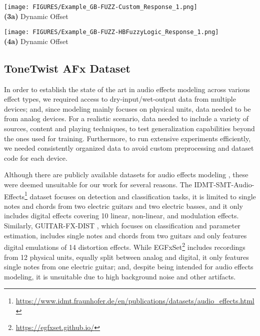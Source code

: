 \begin{figure*}[t]
    \begin{minipage}[b]{.50\textwidth}
        \centering
        \texttt{[image: FIGURES/Example\_GB-FUZZ-Custom\_Response\_1.png]}
        \\\textbf{(3a)} Dynamic Offset
        \label{fig:ex_offblock_response_1}
    \end{minipage}
    \begin{minipage}[b]{.50\textwidth}
        \centering
        \texttt{[image: FIGURES/Example\_GB-FUZZ-HBFuzzyLogic\_Response\_1.png]}
        \\\textbf{(4a)} Dynamic Offset
        \label{fig:ex_offblock_response_2}
    \end{minipage}
    \caption{Examples of response for gray-box models of (1) Flamma Compressor, (2) UA 6176 - 1176LN Limiter, (3) Custom Dynamic Fuzz, (4) Harley Benton Fuzzy Logic.}
    \label{fig:gb-comp-dist_example-response}
\end{figure*}

\subsection{ToneTwist AFx Dataset}
\label{sec:tonetwist}

In order to establish the state of the art in audio effects modeling across various effect types, we required access to dry-input/wet-output data from multiple devices; and, since modeling mainly focuses on physical units, data needed to be from analog devices.
For a realistic scenario, data needed to include a variety of sources, content and playing techniques, to test generalization capabilities beyond the ones used for training.
Furthermore, to run extensive experiments efficiently, we needed consistently organized data to avoid custom preprocessing and dataset code for each device.

Although there are publicly available datasets for audio effects modeling \citep{stein2010automatic, comunita2021guitar, pedroza2022egfxset}, these were deemed unsuitable for our work for several reasons.
The IDMT-SMT-Audio-Effects\footnote{\url{https://www.idmt.fraunhofer.de/en/publications/datasets/audio\_effects.html}} \citep{stein2010automatic} dataset focuses on detection and classification tasks, it is limited to single notes and chords from two electric guitars and two electric basses, and it only includes digital effects covering 10 linear, non-linear, and modulation effects.
Similarly, GUITAR-FX-DIST \citep{comunita2021guitar}, which focuses on classification and parameter estimation,  
includes single notes and chords from two guitars and only features digital emulations of 14 distortion effects.
While EGFxSet\footnote{\url{https://egfxset.github.io/}} \citep{pedroza2022egfxset} includes recordings from 12 physical units, equally split between analog and digital, it only features single notes from one electric guitar; and, despite being intended for audio effects modeling, it is unsuitable due to high background noise and other artifacts.

